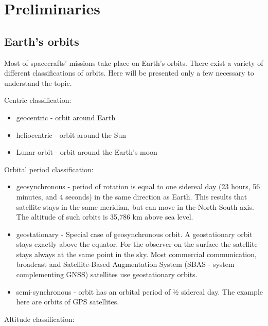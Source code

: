 \documentclass[12pt,a4paper,oneside]{article}
\begin{document}
\newpage
\section{Preliminaries}
\subsection{Earth's orbits}

Most of spacecrafts' missions take place on Earth's orbits. There exist a variety of different classifications of orbits. Here will be presented only a few necessary to understand the topic.

Centric classification:

\begin{itemize}
\item geocentric - orbit around Earth
\item heliocentric - orbit around the Sun
\item Lunar orbit - orbit around the Earth's moon
\end{itemize}

Orbital period classification:

\begin{itemize}
\item geosynchronous - period of rotation is equal to one sidereal day (23 hours, 56 minutes, and 4 seconds) in the same direction as Earth. This results that satellite stays in the same meridian, but can move in the North-South axis. The altitude of such orbits is 35,786 km above sea level.
\item geostationary - Special case of geosynchronous orbit. A geostationary orbit stays exactly above the equator. For the observer on the surface the satellite stays always at the same point in the sky. Most commercial communication, broadcast and Satellite-Based Augmentation System (SBAS - system complementing GNSS) satellites use geostationary orbits.
\item semi-synchronous - orbit has an orbital period of ½ sidereal day. The example here are orbits of GPS satellites.
\end{itemize}

Altitude classification:
\end{document}
